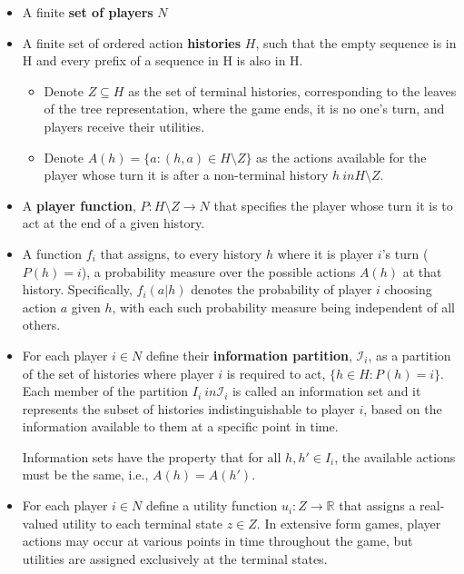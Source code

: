 \documentclass{article}
\begin{document}
\begin{itemize}
\item A finite \textbf{set of players} $N$
\item A finite set of ordered action \textbf{histories} $H$, such that the empty sequence is in H and every prefix of a sequence in H is also in H. 
\begin{itemize}
\item Denote $Z \subseteq H$ as the set of terminal histories, corresponding to the leaves of the tree representation, where the game ends, it is no one's turn, and players receive their utilities.
\item Denote $A(h) = \{ a : (h,a) \in H \setminus Z\}$ as the actions available for the player whose turn it is after a non-terminal history $h \ in H \setminus Z$.
\end{itemize}

\item A \textbf{player function}, $P: H \setminus Z \rightarrow N$ that specifies the player whose turn it is to act at the end of a given history.

\item A function $f_i$ that assigns, to every history $h$ where it is player $i$'s turn ($P(h) = i$), a probability measure over the possible actions $A(h)$ at that history. Specifically, $f_i(a|h)$ denotes the probability of player $i$ choosing action $a$ given $h$, with each such probability measure being independent of all others.


\item For each player $i \in N$ define their \textbf{information partition}, $\mathcal{I}_i$, as a partition of the set of histories where player $i$ is required to act, $\{ h \in H : P(h) = i \}$. Each member of the partition $I_i \ in \mathcal{I}_i$ is called an information set and it 
represents the subset of histories indistinguishable to player $i$, based on the information available to them at a specific point in time.

Information sets have the property that for all $h, h' \in I_i$, the available actions must be the same, i.e., $A(h) = A(h')$. 
\item For each player $i \in N$ define a utility function $u_i: Z \rightarrow \mathbb{R}$ that assigns a real-valued utility to each terminal state $z \in Z$. In extensive form games, player actions may occur at various points in time throughout the game, but utilities are assigned exclusively at the terminal states.

\end{itemize}
\end{document}
